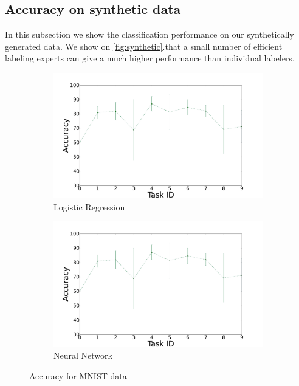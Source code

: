 \documentclass{llncs}
\begin{document}
\subsection{Accuracy on synthetic data}

In this subsection we show the classification performance on our synthetically generated data. We show on \autoref{fig:synthetic}.that a small number of efficient labeling experts can give a much higher performance than individual labelers. 

\begin{figure}[!htb]
    \centering
    \begin{subfigure}[b]{0.45\textwidth}
        \includegraphics[width=\textwidth]{figures/plot_mlp}
        \caption{Logistic Regression}
    \end{subfigure}
    \begin{subfigure}[b]{0.45\textwidth}
        \includegraphics[width=\textwidth]{figures/plot_mlp}
        \caption{Neural Network}
    \end{subfigure}
  \caption{Accuracy for MNIST data}
  \label{fig:synthetic}
\end{figure}
\end{document}
